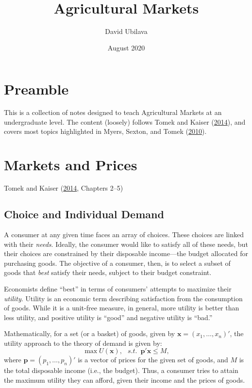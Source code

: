 \documentclass[
]{book}
\title{Agricultural Markets}
\author{David Ubilava}
\date{August 2020}
\begin{document}
\maketitle

{
\setcounter{tocdepth}{1}
\tableofcontents
}
\hypertarget{preamble}{%
\chapter*{Preamble}\label{preamble}}

This is a collection of notes designed to teach Agricultural Markets at an undergraduate level. The content (loosely) follows Tomek and Kaiser (\protect\hyperlink{ref-tomek2014}{2014}), and covers most topics highlighted in Myers, Sexton, and Tomek (\protect\hyperlink{ref-myers2010}{2010}).

\hypertarget{markets-and-prices}{%
\chapter{Markets and Prices}\label{markets-and-prices}}

Tomek and Kaiser (\protect\hyperlink{ref-tomek2014}{2014}, Chapters 2--5)

\hypertarget{choice-and-individual-demand}{%
\section{Choice and Individual Demand}\label{choice-and-individual-demand}}

A consumer at any given time faces an array of choices. These choices are linked with their \emph{needs}. Ideally, the consumer would like to satisfy all of these needs, but their choices are constrained by their disposable income---the budget allocated for purchasing goods. The objective of a consumer, then, is to select a subset of goods that \emph{best} satisfy their needs, subject to their budget constraint.

Economists define ``best'' in terms of consumers' attempts to maximize their \emph{utility}. Utility is an economic term describing satisfaction from the consumption of goods. While it is a unit-free measure, in general, more utility is better than less utility, and positive utility is ``good'' and negative utility is ``bad.''

Mathematically, for a set (or a basket) of goods, given by \(\mathbf{x}=(x_1,\ldots,x_n)'\), the utility approach to the theory of demand is given by: \[\max U(\mathbf{x}),\;~~s.t.\;~\mathbf{p}'\mathbf{x} \leq M,\] where \(\mathbf{p}=(p_1,\ldots,p_n)'\) is a vector of prices for the given set of goods, and \(M\) is the total disposable income (i.e., the budget). Thus, a consumer tries to attain the maximum utility they can afford, given their income and the prices of goods.
\end{document}
